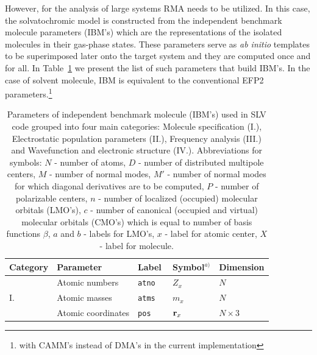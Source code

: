 \documentclass[a4paper,titlepage,twoside,fleqn,12pt]{book}
\begin{document}
\begin{refsection}
However, for the analysis of large systems RMA needs 
to be utilized. In this case, the solvatochromic model is constructed 
from the independent benchmark molecule parameters (IBM's)
which are the representations of the isolated molecules in their gas\hyp{}phase states.
These parameters serve as \emph{ab initio} templates to be superimposed later onto
the target system and they are computed once and for all.
In Table~\ref{t:slv-rma-parameters}
we present the list of such parameters that
build IBM's. In the case of solvent molecule,
IBM is equivalent to the conventional EFP2 parameters.\footnote{with 
CAMM's instead of DMA's in the current implementation}
%
\begin{table}[t!]
\caption{
 Parameters of independent benchmark molecule (IBM's) used in SLV code grouped
 into four main categories: Molecule specification (I.), Electrostatic population
 parameters (II.), Frequency analysis (III.) and Wavefunction and electronic structure (IV.).
 Abbreviations for symbols: $N$ - number of atoms, $D$ - number of distributed multipole centers,
 $M$ - number of normal modes, $M'$ - number of normal modes for which diagonal derivatives
 are to be computed, $P$ - number of polarizable centers, $n$ - number of localized (occupied) molecular
 orbitals (LMO's), $c$ - number of canonical (occupied and virtual) molecular orbitals (CMO's) which is equal to
 number of basis functions $\beta$, $a$ and $b$ - labels for LMO's, $x$ - label for atomic center, 
 $X$ - label for molecule.
\label{t:slv-rma-parameters}}
\begin{tabular*}{1.0\textwidth}{@{\extracolsep{\fill} } lllll}
\hline\hline
 Category   & Parameter & Label & Symbol$^{a)}$ & Dimension \\
\hline
\multirow{3}{*}{I.}
&Atomic numbers                         &\tt{atno    } &   $Z_x$                                     &      $N$                                 \\                                        
&Atomic masses                          &\tt{atms    } &   $m_x$                                     &      $N$                                 \\
&Atomic coordinates                     &\tt{pos     } &   ${\bf r}_x$                               &      $N\times 3$                         \\

\end{tabular*}
\end{table}
\end{refsection}
\end{document}
